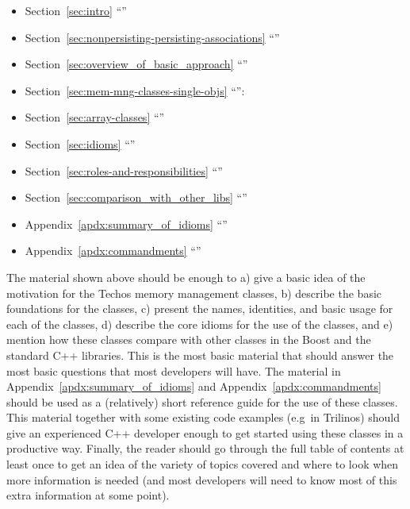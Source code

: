 \documentclass[pdf,ps2pdf,11pt]{SANDreport}
\begin{document}
\begin{itemize}

{}\item Section~\ref{sec:intro} ``''

{}\item Section~\ref{sec:nonpersisting-persisting-associations}
``''

{}\item Section~\ref{sec:overview_of_basic_approach}
``''

{}\item Section~\ref{sec:mem-mng-classes-single-objs}
``{}'':\\[2ex]

{}\item Section~\ref{sec:array-classes}
``{}''

{}\item Section~\ref{sec:idioms} ``{}''

{}\item Section~\ref{sec:roles-and-responsibilities}
``''

{}\item Section~\ref{sec:comparison_with_other_libs}
``{}''

{}\item Appendix~\ref{apdx:summary_of_idioms}
``{}''

{}\item Appendix~\ref{apdx:commandments}
``{}''

\end{itemize}

The material shown above should be enough to a) give a basic idea of
the motivation for the Techos memory management classes, b) describe
the basic foundations for the classes, c) present the names,
identities, and basic usage for each of the classes, d) describe the
core idioms for the use of the classes, and e) mention how these
classes compare with other classes in the Boost and the standard C++
libraries.  This is the most basic material that should answer the
most basic questions that most developers will have.  The material in
Appendix~\ref{apdx:summary_of_idioms} and
Appendix~\ref{apdx:commandments} should be used as a (relatively)
short reference guide for the use of these classes.  This material
together with some existing code examples (e.g\ in Trilinos) should
give an experienced C++ developer enough to get started using these
classes in a productive way.  Finally, the reader should go through
the full table of contents at least once to get an idea of the variety
of topics covered and where to look when more information is needed
(and most developers will need to know most of this extra information
at some point).
\end{document}
